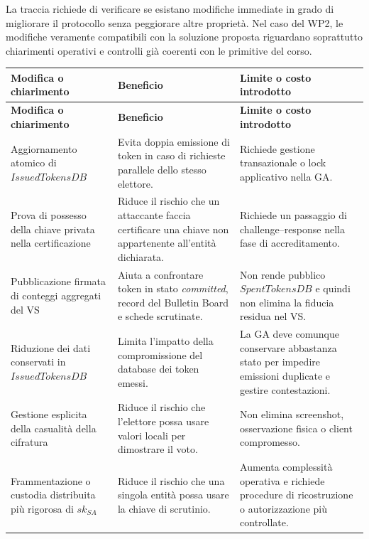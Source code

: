 \documentclass[a4paper,12pt]{article}
\begin{document}
La traccia richiede di verificare se esistano modifiche immediate in grado di migliorare il protocollo senza peggiorare altre proprietà. Nel caso del WP2, le modifiche veramente compatibili con la soluzione proposta riguardano soprattutto chiarimenti operativi e controlli già coerenti con le primitive del corso.

\begin{longtable}{|>{\raggedright\arraybackslash}p{}|>{\raggedright\arraybackslash}p{}|>{\raggedright\arraybackslash}p{}|}
    \hline
    \rowcolor{HeaderBlue}\textbf{Modifica o chiarimento} & \textbf{Beneficio} & \textbf{Limite o costo introdotto} \\
    \hline
    \endfirsthead
    \hline
    \rowcolor{HeaderBlue}\textbf{Modifica o chiarimento} & \textbf{Beneficio} & \textbf{Limite o costo introdotto} \\
    \hline
    \endhead
    Aggiornamento atomico di \(IssuedTokensDB\) & Evita doppia emissione di token in caso di richieste parallele dello stesso elettore. & Richiede gestione transazionale o lock applicativo nella GA. \\
    \hline
    Prova di possesso della chiave privata nella certificazione & Riduce il rischio che un attaccante faccia certificare una chiave non appartenente all'entità dichiarata. & Richiede un passaggio di challenge--response nella fase di accreditamento. \\
    \hline
    Pubblicazione firmata di conteggi aggregati del VS & Aiuta a confrontare token in stato \emph{committed}, record del Bulletin Board e schede scrutinate. & Non rende pubblico \(SpentTokensDB\) e quindi non elimina la fiducia residua nel VS. \\
    \hline
    Riduzione dei dati conservati in \(IssuedTokensDB\) & Limita l'impatto della compromissione del database dei token emessi. & La GA deve comunque conservare abbastanza stato per impedire emissioni duplicate e gestire contestazioni. \\
    \hline
    Gestione esplicita della casualità della cifratura & Riduce il rischio che l'elettore possa usare valori locali per dimostrare il voto. & Non elimina screenshot, osservazione fisica o client compromesso. \\
    \hline
    Frammentazione o custodia distribuita più rigorosa di \(sk_{SA}\) & Riduce il rischio che una singola entità possa usare la chiave di scrutinio. & Aumenta complessità operativa e richiede procedure di ricostruzione o autorizzazione più controllate. \\
    \hline
\end{longtable}
\end{document}
